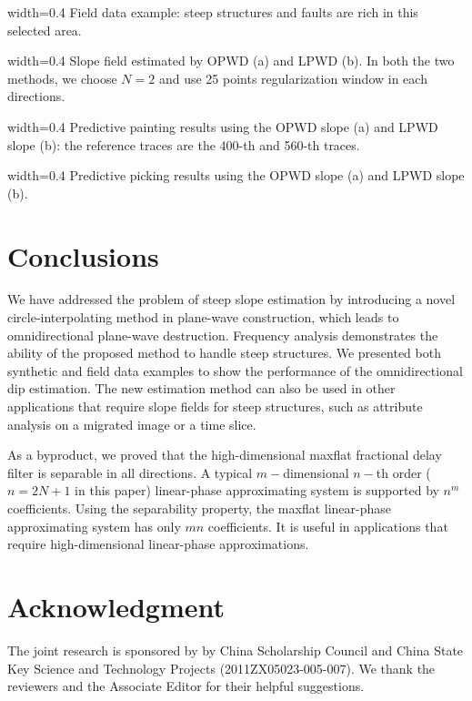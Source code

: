 
{width=0.4\textwidth}{
Field data example: 
steep structures and faults are rich in this selected area.
}

{width=0.4\textwidth}{
Slope field estimated by OPWD (a) and LPWD (b).
In both the two methods, we choose $N=2$ and 
use 25 points regularization window in each directions. 
}


{width=0.4\textwidth}{
Predictive painting results using the OPWD slope (a)
and LPWD slope (b):
the reference traces are the 400-th and 560-th traces.
}

{width=0.4\textwidth}{
Predictive picking results using the OPWD slope (a)
and LPWD slope (b).
}

\section{Conclusions}

We have addressed the problem of steep slope estimation
by introducing a novel circle-interpolating method in plane-wave construction, 
which leads to omnidirectional plane-wave destruction.
Frequency analysis demonstrates the ability 
of the proposed method to handle steep structures.
We presented both synthetic and field data examples to show 
the performance of the omnidirectional dip estimation.
The new estimation method can also be used in other applications 
that require slope fields for steep structures,
such as attribute analysis on
a migrated image or a time slice.

As a byproduct, 
we proved that the high-dimensional maxflat fractional delay filter 
is separable in all directions.
A typical $m-$dimensional $n-$th order 
($n=2N+1$ in this paper) linear-phase 
approximating system is supported by $n^m$ coefficients.
Using the separability property,
the maxflat linear-phase
approximating system has only $mn$ coefficients.
It is useful in applications that require 
high-dimensional linear-phase approximations.

\section*{Acknowledgment}
The joint research is sponsored by by China Scholarship Council and
China State Key Science and Technology Projects (2011ZX05023-005-007).
We thank the reviewers and the Associate Editor for
their helpful suggestions.

